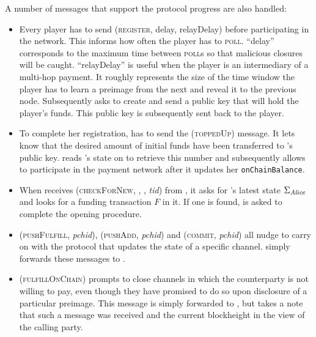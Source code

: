   A number of  messages that support the protocol progress are also handled:
  \begin{itemize}
    \item Every player has to send (\textsc{register}, delay, relayDelay) before
    participating in the network. This informs \fpaynet{} how often the player
    has to \textsc{poll}. ``delay'' corresponds to the maximum time between
    \textsc{poll}s so that malicious closures will be caught. ``relayDelay'' is
    useful when the player is an intermediary of a multi-hop payment. It roughly
    represents the size of the time window the player has to learn a preimage
    from the next and reveal it to the previous node. Subsequently \fpaynet{}
    asks \simulator{} to create and send a public key that will hold the
    player's funds. This public key is subsequently sent back to the player.
    \item To complete her registration, \alice{} has to send the
    (\textsc{toppedUp}) message. It lets \fpaynet{} know that the desired amount
    of initial funds have been transferred to \alice's public key. \fpaynet{}
    reads \alice's state on \ledger{} to retrieve this number and subsequently
    allows \alice{} to participate in the payment network after it updates her
    \texttt{onChainBalance}.
    \item When \fpaynet{} receives (\textsc{checkForNew}, \alice, \bob,
    \textit{tid}) from \alice, it asks \ledger{} for \alice's latest state
    $\Sigma_{\mathit{Alice}}$ and looks for a funding transaction $F$ in it. If one is
    found, \simulator{} is asked to complete the opening procedure.
    \item (\textsc{pushFulfill}, \textit{pchid}),
    (\textsc{pushAdd}, \textit{pchid}) and (\textsc{commit}, \textit{pchid})
    all nudge \simulator{} to carry on with the protocol that updates the state
    of a specific channel. \fpaynet{} simply forwards these messages to
    \simulator.
    \item (\textsc{fulfillOnChain}) prompts \simulator{} to close channels in which
    the counterparty is not willing to pay, even though they have promised to do
    so upon disclosure of a particular preimage. This message is simply forwarded to
    \simulator{}, but \fpaynet{} takes a note that such a message was
    received and the current blockheight in the view of the calling party.
  \end{itemize}

